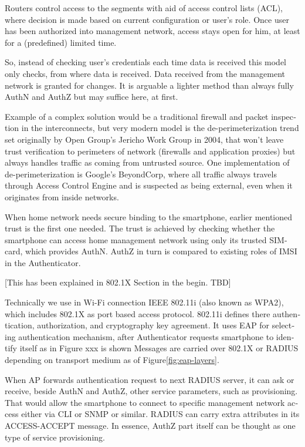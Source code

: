 \documentclass[12pt,a4paper,english]{tutthesis}
\begin{document}
\begin{otherlanguage}{english}
Routers control access to the segments with aid of 
access control lists (ACL), where decision is made based on current configuration or user's
role.  Once user has been authorized into management network, access
stays open for him, at least for a (predefined) limited time.

So, instead of checking user's credentials each time data is received
this model only checks, from where data is received. 
Data received from the management network is granted for changes.
It is arguable a lighter method than always
fully AuthN and AuthZ but may suffice here, at first.



Example of a complex solution would be a traditional firewall and packet
inspection in the interconnects, but very modern model
is the de-perimeterization trend set originally by Open Group's
Jericho Work Group in 2004, that won't leave trust verification to
perimeters of network (firewalls and application proxies) but 
always handles traffic as coming from untrusted source.\cite{jericho2004}
One implementation of de-perimeterization is 
Google's BeyondCorp\cite{2014-beyondcorp}, 
where all traffic always travels through Access Control Engine
and is suspected as being external, even when it originates from
inside networks. 





When home network needs secure binding to the smartphone, earlier
mentioned trust is the first one needed.  The trust is achieved by
checking whether the smartphone can access home management
network using only its trusted SIM-card, which provides AuthN. AuthZ in
turn is compared to existing roles of IMSI in the Authenticator.


[This has been explained in 802.1X Section in the begin. TBD]

Technically we use in Wi-Fi connection IEEE 802.11i (also known as WPA2), which includes
802.1X as port based access protocol.  802.11i defines there
authentication, authorization, and cryptography key agreement.
 It uses EAP for selecting authentication 
mechanism, after Authenticator requests smartphone to identify itself as in Figure xxx is shown
Messages are carried over 802.1X or RADIUS depending on transport
medium as of Figure\ref{fig:eap-layers}.


When AP forwards authentication request to next RADIUS server, it can
ask or receive, beside AuthN and AuthZ, other service parameters, such
as provisioning. That would allow the smartphone to connect to
specific management network access either via CLI or SNMP or
 similar\cite[p.4]{rfc5608}.  RADIUS can carry extra attributes in its
ACCESS-ACCEPT message.   In essence, AuthZ part itself can be thought as
one type of service provisioning. 



\end{otherlanguage}
\end{document}
